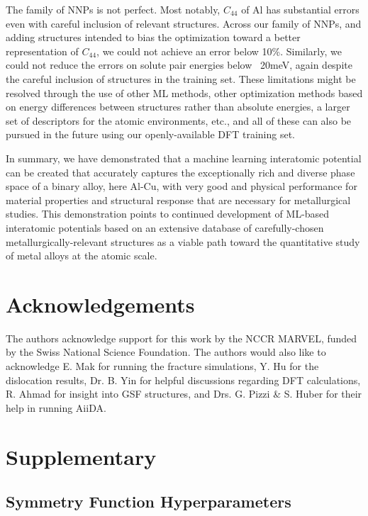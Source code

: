 \documentclass{article}
\begin{document}
The family of NNPs is not perfect.  Most notably, $C_{44}$ of Al has substantial errors even with careful inclusion of relevant structures.
Across our family of NNPs, and adding structures intended to bias the optimization toward a better representation of $C_{44}$, we could not achieve an error below 10\%.  Similarly, we could not reduce the errors on solute pair energies below ~20meV, again despite the careful inclusion of structures in the training set.  These limitations might be resolved through the use of other ML methods, other optimization methods based on energy differences between structures rather than absolute energies, a larger set of descriptors for the atomic environments, etc., and all of these can also be pursued in the future using our openly-available DFT training set.

In summary, we have demonstrated that a machine learning interatomic potential can be created that accurately captures the exceptionally rich and diverse phase space of a binary alloy, here Al-Cu, with very good and physical performance for material properties and structural response that are necessary for metallurgical studies.  This demonstration points to continued development of ML-based interatomic potentials based on an extensive database of carefully-chosen metallurgically-relevant structures as a viable path toward the quantitative study of metal alloys at the atomic scale.

\section{Acknowledgements}
The authors acknowledge support for this work by the NCCR MARVEL, funded by the Swiss National Science Foundation. The authors would also like to acknowledge E. Mak for running the fracture simulations, Y. Hu for the dislocation results, Dr. B. Yin for helpful discussions regarding DFT calculations, R. Ahmad for insight into GSF structures, and Drs. G. Pizzi \& S. Huber for their help in running AiiDA.

\newpage
  

\newpage
\appendix
\section{Supplementary}
\subsection{Symmetry Function Hyperparameters} \label{apd_sct:symmfunc_hyperparam}
\end{document}
